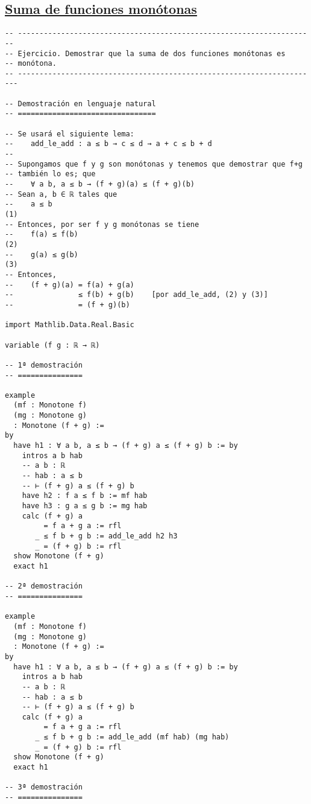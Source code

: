 \subsection{\href{./src/Logica/Suma\_de\_funciones\_monotonas.lean}{Suma de funciones monótonas}}
\label{sec:org4180271}
\begin{verbatim}
-- ---------------------------------------------------------------------
-- Ejercicio. Demostrar que la suma de dos funciones monótonas es
-- monótona.
-- ----------------------------------------------------------------------

-- Demostración en lenguaje natural
-- ================================

-- Se usará el siguiente lema:
--    add_le_add : a ≤ b → c ≤ d → a + c ≤ b + d
--
-- Supongamos que f y g son monótonas y tenemos que demostrar que f+g
-- también lo es; que
--    ∀ a b, a ≤ b → (f + g)(a) ≤ (f + g)(b)
-- Sean a, b ∈ ℝ tales que
--    a ≤ b                                                          (1)
-- Entonces, por ser f y g monótonas se tiene
--    f(a) ≤ f(b)                                                    (2)
--    g(a) ≤ g(b)                                                    (3)
-- Entonces,
--    (f + g)(a) = f(a) + g(a)
--               ≤ f(b) + g(b)    [por add_le_add, (2) y (3)]
--               = (f + g)(b)

import Mathlib.Data.Real.Basic

variable (f g : ℝ → ℝ)

-- 1ª demostración
-- ===============

example
  (mf : Monotone f)
  (mg : Monotone g)
  : Monotone (f + g) :=
by
  have h1 : ∀ a b, a ≤ b → (f + g) a ≤ (f + g) b := by
    intros a b hab
    -- a b : ℝ
    -- hab : a ≤ b
    -- ⊢ (f + g) a ≤ (f + g) b
    have h2 : f a ≤ f b := mf hab
    have h3 : g a ≤ g b := mg hab
    calc (f + g) a
         = f a + g a := rfl
       _ ≤ f b + g b := add_le_add h2 h3
       _ = (f + g) b := rfl
  show Monotone (f + g)
  exact h1

-- 2ª demostración
-- ===============

example
  (mf : Monotone f)
  (mg : Monotone g)
  : Monotone (f + g) :=
by
  have h1 : ∀ a b, a ≤ b → (f + g) a ≤ (f + g) b := by
    intros a b hab
    -- a b : ℝ
    -- hab : a ≤ b
    -- ⊢ (f + g) a ≤ (f + g) b
    calc (f + g) a
         = f a + g a := rfl
       _ ≤ f b + g b := add_le_add (mf hab) (mg hab)
       _ = (f + g) b := rfl
  show Monotone (f + g)
  exact h1

-- 3ª demostración
-- ===============


\end{verbatim}

